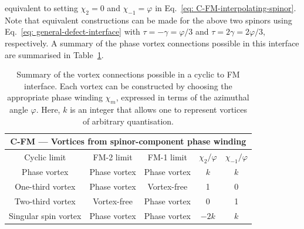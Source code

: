 equivalent to setting \(\chi_2 = 0\) and \(\chi_{-1}=\varphi \) in
Eq.~\eqref{eq: C-FM-interpolating-spinor}.
Note that equivalent constructions can be made for the above two spinors using
Eq.~\eqref{eq: general-defect-interface} with \(\tau=-\gamma=\varphi/3\) and
\(\tau=2\gamma=2\varphi/3\), respectively.
A summary of the phase vortex connections possible in this interface are
summarised in Table~\ref{tab: C-FM-vortices}.
\begin{table}
    \centering
    \begin{tabular}{ccccc}
        \toprule
        \multicolumn{5}{c}{C-FM --- Vortices from spinor-component phase
            winding} \\
        \midrule
        Cyclic limit & FM-2 limit & FM-1 limit & \(\chi_2/\varphi \)
        & \(\chi_{-1}/\varphi \) \\
        \midrule
         Phase vortex & Phase vortex & Phase vortex & \(k\) & \(k\) \\ 
         One-third vortex & Phase vortex & Vortex-free & 1 & 0 \\
         Two-third vortex & Vortex-free & Phase vortex & 0 & 1 \\
         Singular spin vortex & Phase vortex & Phase vortex & \(-2k\) & \(k\) \\
        \bottomrule
    \end{tabular}
    \caption[Examples of possible vortex connections across a cyclic to
    ferromagnetic interface]{\label{tab: C-FM-vortices}Summary of the vortex
    connections possible in a cyclic to FM interface.
    Each vortex can be constructed by choosing the appropriate phase winding
    \(\chi_m\), expressed in terms of the azimuthal angle \(\varphi \).
    Here, \(k \) is an integer that allows one to represent vortices of
    arbitrary quantisation.}
\end{table}

